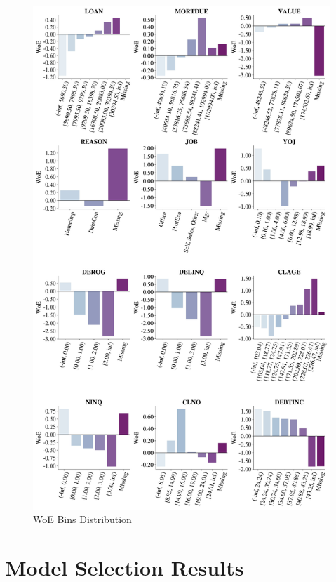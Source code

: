 \begin{figure}[H]
    \centering
    \caption{WoE Bins Distribution}\vspace{0.5em}
    \label{fig:woedist}
    \includegraphics[width=140mm]{Figures/WoE_Distribution.jpg}
    
    \vspace{-1em}
\end{figure}

\section{Model Selection Results}


